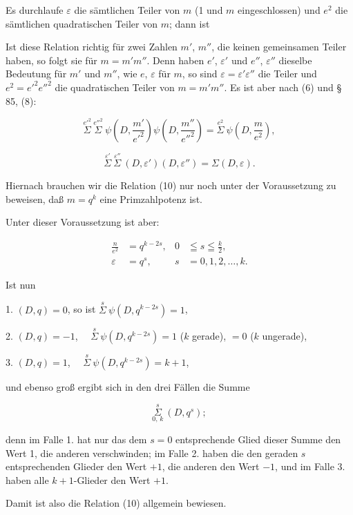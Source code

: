 Es durchlaufe $\varepsilon$ die sämtlichen Teiler von $m$ (1 und $m$
eingeschlossen) und $e^2$ die sämtlichen quadratischen Teiler von
$m$; dann ist


Ist diese Relation richtig für zwei Zahlen $m'$, $m''$, die keinen
gemeinsamen Teiler haben, so folgt sie für $m=m'm''$. Denn
haben $e'$, $\varepsilon'$ und $e''$, $\varepsilon''$ dieselbe Bedeutung für $m'$ und $m''$, wie
$e$, $\varepsilon$ für $m$, so sind $\varepsilon=\varepsilon'\varepsilon''$ die Teiler und $e^2=e'^2e''^2$ die
quadratischen Teiler von $m=m'm''$. Es ist aber nach (6) und
\S\,85, (8):

\[ \overset{e'^2}{\Sigma}\ \overset{e''^2}{\Sigma}\ \psi\!\left(D,\frac{m'}{e'^2}\right)\psi\!\left(D,\frac{m''}{e''^2}\right) = \overset{e^2}{\Sigma}\ \psi\!\left(D,\frac{m}{e^2}\right), \]

\[ \overset{\varepsilon'}{\Sigma}\ \overset{\varepsilon''}{\Sigma}\ (D,\varepsilon')(D,\varepsilon'') = \Sigma(D,\varepsilon). \]

Hiernach brauchen wir die Relation (10) nur noch unter der
Voraussetzung zu beweisen, daß $m=q^k$ eine Primzahlpotenz ist.

Unter dieser Voraussetzung ist aber:

\[
\begin{aligned}
\frac{n}{e^2}&=q^{k-2s}, & 0&\leqq s \leqq \frac{k}{2},\\
\varepsilon&=q^s, & s&=0,1,2,\dots,k.
\end{aligned}
\] %

Ist nun

1. $(D,q)=0$, so ist $\overset{s}{\Sigma}\ \psi(D,q^{k-2s}) = 1$,

2. $(D,q)=-1$, \text{\glqq}\ \text{\glqq}\ $\overset{s}{\Sigma}\ \psi(D,q^{k-2s}) = 1$ ($k$ gerade),
\hspace{4em}$= 0$ ($k$ ungerade),

3. $(D,q)=1$, \text{\glqq}\ \text{\glqq}\ $\overset{s}{\Sigma}\ \psi(D,q^{k-2s}) = k+1$,

und ebenso groß ergibt sich in den drei Fällen die Summe

\[ \underset{0,\,k}{\overset{s}{\Sigma}}\ (D,q^s); \]

denn im Falle 1. hat nur das dem $s=0$ entsprechende Glied
dieser Summe den Wert 1, die anderen verschwinden; im Falle 2.
haben die den geraden $s$ entsprechenden Glieder den Wert $+1$,
die anderen den Wert $-1$, und im Falle 3. haben alle
$k+1$-Glieder den Wert $+1$.

Damit ist also die Relation (10) allgemein bewiesen.
